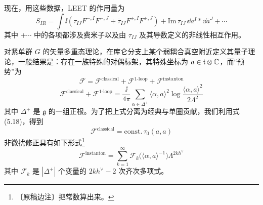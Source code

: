 
现在，用这些数据，LEET 的作用量为
\begin{equation}
S_{IR}=\int \ii\left(\tau_{IJ}F^{-,I}F^{-,J}+\bar\tau_{IJ}F^{+,I}F^{+,J}\right)
+\mathrm{Im}\,\tau_{IJ}\,\dd a^{I}\ast \dd\bar a^{J}+\cdots
\tag{5.28}
\end{equation}
其中 $+\cdots$ 中的各项都涉及费米子以及由 $\tau_{IJ}$ 及其导数定义的非线性相互作用。

对紧单群 $G$ 的矢量多重态理论，在库仑分支上某个弱耦合真空附近定义其量子理论，一般结果是：存在一族特殊的对偶标架，其特殊坐标为 $a\in\mathfrak{t}\otimes\mathbb{C}$，而“预势”为
\begin{equation}
\mathcal{F}=\mathcal{F}^{\text{classical}}+\mathcal{F}^{1\text{-loop}}+\mathcal{F}^{\text{instanton}}
\tag{5.29}
\end{equation}
\begin{equation}
\mathcal{F}^{\text{classical}}+\mathcal{F}^{1\text{-loop}}
=\frac{\ii}{4\pi}\sum_{\alpha\in\Delta^{+}}\langle\alpha,a\rangle^{2}
\log\frac{\langle\alpha,a\rangle^{2}}{2\Lambda^{2}}
\tag{5.30}
\end{equation}
其中 $\Delta^{+}$ 是 $\mathfrak{g}$ 的一组正根。为了把上式分离为经典与单圈贡献，我们利用式 (5.18)，得到
\begin{equation}
\mathcal{F}^{\text{classical}}=\text{const.}\,\tau_{0}(a,a)
\tag{5.31}
\end{equation}
非微扰修正具有如下形式\footnote{〔原稿边注〕把常数算出来。}
\begin{equation}
\mathcal{F}^{\text{instanton}}
=\sum_{k=1}^{\infty}\mathcal{F}_{k}\big(\langle\alpha,a\rangle^{-1}\big)\Lambda^{2kh^{\vee}}
\tag{5.32}
\end{equation}
其中 $\mathcal{F}_{k}$ 是 $|\Delta^{+}|$ 个变量的 $2kh^{\vee}-2$ 次齐次多项式。

